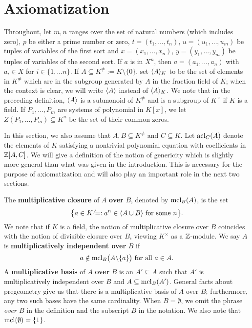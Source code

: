 \section{Axiomatization}

\noindent Throughout, let $m, n$ ranges over the set of natural numbers (which includes zero), $p$ be either a prime number or zero, $t =(t_1, \ldots, t_n)$, $u =(u_1, \ldots, u_m)$ be tuples of variables of the first sort and $x= (x_1, \ldots, x_n)$, $y = (y_1, \ldots, y_m)$ be tuples of variables of the second sort. If $a$ is in $X^n$, then $a = (a_1, \ldots, a_n)$ with $a_i \in X$ for $i \in \{1, \ldots n\}$. If $A \subseteq K^\neq := K \setminus \{ 0 \}$, set $\langle A \rangle_K $ to be the set of elements in $K^\neq$ which are in the subgroup generated by $A$ in the fraction field of $K$; when the context is clear, we will write $\langle A \rangle $ instead of $\langle A \rangle_K $. We note that in the preceding definition, $\langle A \rangle $  is a submonoid of $K^\neq$ and is a subgroup of $K^\times$ if $K$ is a field. If $P_1, \ldots, P_m$ are systems of polynomial in $K[x]$, we let $Z(P_1, \ldots, P_m) \subseteq K^n$ be the set of their common zeros.

In this section, we also assume that $A, B \subseteq K^\neq$ and $C \subseteq K$. Let \( \mathrm{acl}_C(A) \) denote the elements of $K$ satisfying a nontrivial polynomial equation with coefficients in $\mathbb{Z}[A,C]$. We will give a definition of the notion of genericity which is slightly more general than what was given in the introduction.
This is necessary  for the purpose of axiomatization and will also play an important role in the next two sections.



The \textbf{multiplicative closure} of $A$ \textbf{over} $B$, denoted by $\mathrm{mcl}_B(A)$, is the set 
$$ \big\{ a \in K^\neq : a^n \in \langle A \cup B \rangle \text{ for some } n \big\}. $$ 
%
%
We note that if $K$ is a field, the notion of multiplicative closure over $B$ coincides with the notion of divisible closure over $B$, viewing \(K^\times\) as a \( \mathbb{Z}\)-module. 
%
We say \(A\) is {\bf multiplicatively independent over} \(B\) if 
$$ a \notin \mathrm{mcl}_B \big(A \backslash \{a\}\big) \text{ for all } a \in A. $$
%
A {\bf multiplicative basis} of \( A\) \textbf{over} \(B\) is an \(A'\subseteq A\) such that $A'$ is multiplicatively independent over \(B\) and \( A \subseteq \mathrm{mcl}_B(A') \).
%
General facts about pregeometry give us that
%
there is a multiplicative basis of \(A\) over \(B\); furthermore, any two such bases have the same cardinality.
%
When $B =\emptyset$, we omit the phrase {\it over $B$} in the definition and the subscript $B$ in the notation. We also note that $\mathrm{mcl}( \emptyset)= \{ 1\} $.
%
\newpage

